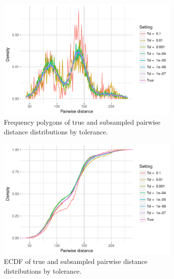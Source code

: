 \documentclass{article}
\begin{document}
\begin{figure}
    \begin{subfigure}{.49\textwidth}
        \includegraphics[width=\linewidth]{Figures/PairwiseDistance/freqpoly_by_tol.pdf}
   		\caption{Frequency polygons of true and subsampled pairwise distance distributions by tolerance.}
    	\label{fig:FreqPoly}
    \end{subfigure}
    \begin{subfigure}{.49\textwidth}
        \includegraphics[width=\linewidth]{Figures/PairwiseDistance/ecdf_by_tol.pdf}
    	\caption{ECDF of true and subsampled pairwise distance distributions by tolerance.}
    	\label{fig:ECDF}
    \end{subfigure}
    \begin{subfigure}[b]{.49\textwidth}

\end{subfigure}
\end{figure}
\end{document}
